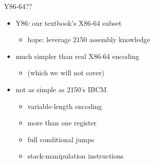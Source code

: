 \begin{frame}{Y86-64??}
    \begin{itemize}
    \item Y86: our textbook's X86-64 subset
        \begin{itemize}
        \item hope: leverage 2150 assembly knowledge
        \end{itemize}
    \item much simpler than real X86-64 encoding
        \begin{itemize}
        \item (which we will not cover)
        \end{itemize}
    \item not as simple as 2150's IBCM
        \begin{itemize}
        \item variable-length encoding
        \item more than one register
        \item full conditional jumps
        \item stack-manipulation instructions
        \end{itemize}
    \end{itemize}
\end{frame}


